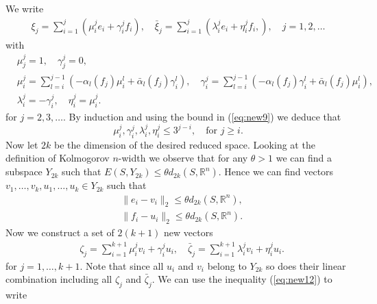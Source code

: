 We write
\begin{equation} \label{eq:new10}
\begin{aligned}
	\xi_j = \sum_{i=1}^j \left( \mu_i^j e_i + \gamma_i^j f_i \right), \quad \bar{\xi}_j = \sum_{i=1}^j \left( \lambda_i^j e_i + \eta_i^j f_i,  \right), \quad j=1,2,\dots
\end{aligned}
\end{equation}
with
\begin{equation} \label{eq:new11}
\begin{aligned}
	&\mu^j_j = 1, \quad \gamma^j_j = 0, \\
	&\mu_i^j = \sum_{l=i}^{j-1}\left( - \alpha_l(f_j) \mu_i^l  + \bar{\alpha}_l(f_j) \gamma_i^l \right), \quad\gamma_i^j = \sum_{l=i}^{j-1}\left( - \alpha_l(f_j) \gamma_i^l  + \bar{\alpha}_l(f_j) \mu_i^l \right), \\
	&\lambda^j_i = - \gamma ^j_i, \quad \eta^j_i = \mu^j_i.
\end{aligned}
\end{equation}
for $j=2,3,\dots$. By induction and using the bound in (\ref{eq:new9}) we deduce that
\begin{equation} \label{eq:new12}
	\mu^j_i,\gamma^j_i,\lambda^j_i,\eta^j_i \leq 3^{j-i}, \quad \text{for } j\geq i.
\end{equation}
Now let $2k$ be the dimension of the desired reduced space. Looking at the definition of Kolmogorov $n$-width we observe that for any $\theta > 1$ we can find a subspace $Y_{2k}$ such that $E(S,Y_{2k}) \leq \theta d_{2k}(S,\mathbb R^n)$. Hence we can find vectors $v_1,\dots,v_k,u_1,\dots,u_k\in Y_{2k}$ such that
\begin{equation} \label{eq:new13}
\begin{aligned}
	& \|e_i - v_i\|_2 \leq \theta d_{2k}(S,\mathbb R^n), \\
	& \|f_i - u_i\|_2 \leq \theta d_{2k}(S,\mathbb R^n).
\end{aligned}
\end{equation}
Now we construct a set of $2(k+1)$ new vectors
\begin{equation} \label{eq:new14}
\begin{aligned}
	& \zeta_j = \sum_{i=1}^{k+1} \mu_i^j v_i + \gamma^j_i u_i,\quad \bar{\zeta}_j = \sum_{i=1}^{k+1} \lambda_i^j v_i + \eta^j_i u_i.
\end{aligned}
\end{equation}
for $j = 1,\dots,k+1$. Note that since all $u_i$ and $v_i$ belong to $Y_{2k}$ so does their linear combination including all $\zeta_j$ and $\bar{\zeta}_j$. We can use the inequality (\ref{eq:new12}) to write
